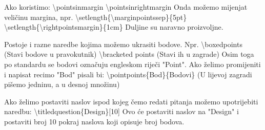 \documentclass[addpoints,answers]{beamer}
\newcounter{points}
\begin{document}
\begin{frame}
Ako koristimo:
\newline
\newline
\color{blue}
\textbackslash{pointsinmargin}
\newline
\newline
\textbackslash{pointsinrightmargin}
\newline
\newline
\color{black}
Onda možemo mijenjat veličinu margina, npr.
\newline
\newline
\color{blue}
\textbackslash{setlength\{\textbackslash{marginpointssep}\}}\{5pt\}
\newline
\newline
\textbackslash{setlength\{\textbackslash{rightpointsmargin}\}}\{1cm\}
\color{black}
\newline
\newline
Duljine su naravno proizvoljne.
\end{frame}


\begin{frame}
Postoje i razne naredbe kojima možemo ukrasiti bodove. Npr.
\newline
\newline
\color{blue}
\textbackslash{boxedpoints}
\color{black}
(Stavi bodove u pravokutnik)
\color{blue}
\newline
\newline
\color{blue}
\textbackslash{bracketed points}
\color{black}
(Stavi ih u zagrade)
\newline
\newline
Osim toga po standardu se bodovi označuju engleskom riječi "Point". Ako želimo promijeniti i napisat recimo "Bod" pisali bi:
\newline
\newline
\color{blue}
\textbackslash{pointpoints\{Bod\}\{Bodovi\}}
\color{black}
\newline
(U lijevoj zagradi pišemo jedninu, a u desnoj množinu)
\color{blue}
\end{frame}

\begin{frame}
Ako želimo postaviti naslov ispod kojeg čemo redati pitanja možemo upotrijebiti naredbu:
\newline
\newline
\color{blue}
\textbackslash{titledquestion\{Design\}[10]}
\color{black}
\newline
\newline
Ovo će postaviti naslov na "Design" i postaviti broj 10 pokraj naslova koji opisuje broj bodova.
\end{frame}
\end{document}
